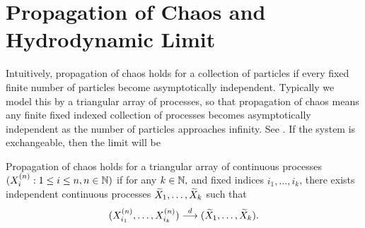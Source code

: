 \section{Propagation of Chaos and Hydrodynamic Limit}
Intuitively, propagation of chaos holds for a collection of particles if every fixed finite number of particles become asymptotically independent. Typically we model this by a triangular array of processes, so that propagation of chaos means any finite fixed indexed collection
of processes becomes asymptotically independent as the number of particles approaches infinity. See \cite{Sznitman1}.  If the system is exchangeable, then the limit will be 
\begin{definition}\label{def:POC}
	Propagation of chaos holds for a triangular array of continuous processes $(X_i^{(n)}: 1 \leq i \leq n, n \in \mathbb{N})$ if for any $k \in \mathbb{N},$ and fixed indices $i_1, \dots, i_k$, there exists independent continuous processes $\widetilde{X}_1, \dots, \widetilde{X}_k$ such that
	\[
	(X_{i_1}^{(n)}, \dots, X_{i_k}^{(n)}) \overset{d}{\longrightarrow} (\widetilde{X}_1, \dots, \widetilde{X}_k).
	\]
\end{definition}

